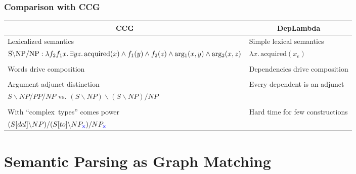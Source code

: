 \documentclass[mathserif,12pt]{beamer}
\newcommand{\hlight}[1]{{\color{blue!80} #1}}
\newcommand{\lx}{\lambda x }
\renewcommand{\land}{\wedge}
\newcommand{\lspace}{.\,}
\begin{document}
\begin{frame}
\frametitle{Comparison with CCG}

\vspace{-2em}
\begin{center}
\begin{tabular}{p{5.6cm}|p{5.6cm}}
 \multicolumn{1}{c|}{\hlight{CCG}} & \multicolumn{1}{c}{\hlight{DepLambda}} \\
 \midrule
 Lexicalized semantics & Simple lexical semantics \\
 \scriptsize $\hbox{S} \backslash \hbox{NP}/ \hbox{NP} : \lambda f_2 f_1 x \lspace \exists y z \lspace \mathrm{acquired}(x) \land f_1(y) \land f_2(z) \land \mathrm{arg_1}(x, y) \land \mathrm{arg_2}(x, z)$  & \scriptsize $\lx \lspace \mathrm{acquired}(x_e)$ \\ 
\\
 Words drive composition & Dependencies drive composition \\
\\
 Argument adjunct distinction  & Every dependent is an adjunct \\
 \scriptsize $S\backslash NP/PP/NP$ vs. $(S\backslash NP)\backslash(S\backslash NP)/NP$ & \\
\\
 With ``complex~types'' comes power &  Hard time for few constructions \\
 \scriptsize $(S[dcl]\backslash NP)/(S[to]\backslash NP_{\hlight{\bf x}})/NP_{\hlight{\bf x}}$ &  \\
\end{tabular}
\end{center}
\end{frame}

\section{Semantic Parsing as Graph Matching}
\end{document}
